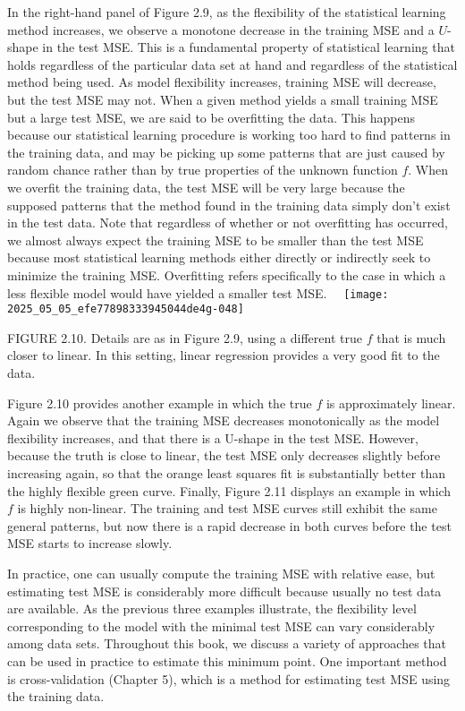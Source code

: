 \documentclass[10pt]{article}
\begin{document}
In the right-hand panel of Figure 2.9, as the flexibility of the statistical learning method increases, we observe a monotone decrease in the training MSE and a $U$-shape in the test MSE. This is a fundamental property of statistical learning that holds regardless of the particular data set at hand and regardless of the statistical method being used. As model flexibility increases, training MSE will decrease, but the test MSE may not. When a given method yields a small training MSE but a large test MSE, we are said to be overfitting the data. This happens because our statistical learning procedure is working too hard to find patterns in the training data, and may be picking up some patterns that are just caused by random chance rather than by true properties of the unknown function $f$. When we overfit the training data, the test MSE will be very large because the supposed patterns that the method found in the training data simply don't exist in the test data. Note that regardless of whether or not overfitting has occurred, we almost always expect the training MSE to be smaller than the test MSE because most statistical learning methods either directly or indirectly seek to minimize the training MSE. Overfitting refers specifically to the case in which a less flexible model would have yielded a smaller test MSE.\
\
\texttt{[image: 2025\_05\_05\_efe77898333945044de4g-048]}

FIGURE 2.10. Details are as in Figure 2.9, using a different true $f$ that is much closer to linear. In this setting, linear regression provides a very good fit to the data.

Figure 2.10 provides another example in which the true $f$ is approximately linear. Again we observe that the training MSE decreases monotonically as the model flexibility increases, and that there is a U-shape in the test MSE. However, because the truth is close to linear, the test MSE only decreases slightly before increasing again, so that the orange least squares fit is substantially better than the highly flexible green curve. Finally, Figure 2.11 displays an example in which $f$ is highly non-linear. The training and test MSE curves still exhibit the same general patterns, but now there is a rapid decrease in both curves before the test MSE starts to increase slowly.

In practice, one can usually compute the training MSE with relative ease, but estimating test MSE is considerably more difficult because usually no test data are available. As the previous three examples illustrate, the flexibility level corresponding to the model with the minimal test MSE can vary considerably among data sets. Throughout this book, we discuss a variety of approaches that can be used in practice to estimate this minimum point. One important method is cross-validation (Chapter 5), which is a method for estimating test MSE using the training data.
\end{document}

